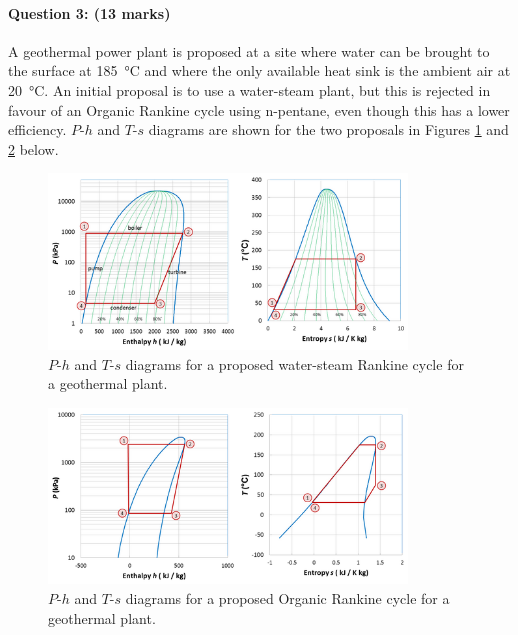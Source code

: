 \documentclass[a4paper,12pt,fleqn]{article}
\begin{document}
\paragraph{\textbf{Question 3: (13 marks)}}
A geothermal power plant is proposed at a site where water can be brought to the surface at \SI{185}{\celsius} and where the only available heat sink is the ambient air at \SI{20}{\celsius}. An initial proposal is to use a water-steam plant, but this is rejected in favour of an Organic Rankine cycle using n-pentane, even though this has a lower efficiency.
$P$-$h$ and $T$-$s$ diagrams are shown for the two proposals in Figures \ref{figure:q3a} and \ref{figure:q3b} below.
\begin{figure}[h]
\centering
\includegraphics[width=0.85\textwidth]{./figures/steam-geo}
\caption{$P$-$h$ and $T$-$s$ diagrams for a proposed water-steam Rankine cycle for a geothermal plant.}
\label{figure:q3a}
\end{figure}
\begin{figure}[h]
\centering
\includegraphics[width=0.85\textwidth]{./figures/ORC-geo}
\caption{$P$-$h$ and $T$-$s$ diagrams for a proposed Organic Rankine cycle for a geothermal plant.}
\label{figure:q3b}
\end{figure}
\end{document}
